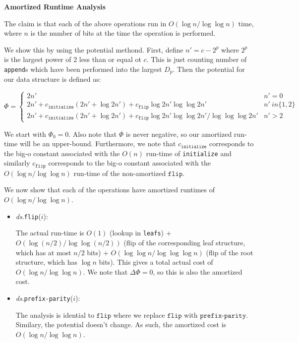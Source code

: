 \documentclass[12pt]{exam}
\newcommand*{\bigo}[1]{O \left( #1 \right)}
\begin{document}
\begin{questions}
\begin{solution}
\textbf{Amortized Runtime Analysis}

The claim is that each of the above operations run in $\bigo{\log n / \log \log n}$ time, where $n$ is the number of bits at the time the operation is performed.

We show this by using the potential methond. First, define $n' = c - 2^p$ where $2^p$ is the largest power of 2 less than or equal ot $c$. This is just counting number of \texttt{append}s which have been performed into the largest $D_p$. Then the potential for our data structure is defined as:

$$
  \Phi =
    \begin{cases}
      2n' & n' = 0 \\
      2n' + c_{\texttt{initialize}}(2n' + \log 2n') + c_{\texttt{flip}} \log 2n' \log \log 2n' & n' \ in \{1,2\} \\
      2n' + c_{\texttt{initialize}}(2n' + \log 2n') + c_{\texttt{flip}} \log 2n' \log \log 2n' / \log \log \log 2n' & n' > 2
    \end{cases}
$$

  We start with $\Phi_0 = 0$. Also note that $\Phi$ is never negative, so our amortized run-time will be an upper-bound. Furthermore, we note that $c_{\texttt{initialize}}$ corresponds to the big-o constant associated with the $\bigo{n}$ run-time of \texttt{initialize} and similarly $c_{\texttt{flip}}$ corresponds to the big-o constant associated with the $\bigo{\log n / \log \log n}$ run-time of the non-amortized $\texttt{flip}$.

We now show that each of the operations have amortized runtimes of $\bigo{\log n / \log \log n}$.

\begin{itemize}
  \item \textit{ds}.\texttt{flip}($i$):

    The actual run-time is $\bigo{1}$ (lookup in \texttt{leafs}) + $\bigo{\log (n/2) / \log \log (n/2)}$ (flip of the corresponding leaf structure, which has at most $n/2$ bits) + $\bigo{\log \log n / \log \log \log n}$ (flip of the root structure, which has $\log n$ bits). This gives a total actual cost of $\bigo{\log n / \log \log n}$. We note that $\Delta \Phi = 0$, so this is also the amortized cost.

  \item \textit{ds}.\texttt{prefix-parity}($i$):

    The analysis is idential to $\texttt{flip}$ where we replace $\texttt{flip}$ with $\texttt{prefix-parity}$. Similary, the potential doesn't change. As such, the amortized cost is $\bigo{\log n / \log \log n}$.


\end{itemize}
\end{solution}
\end{questions}
\end{document}
